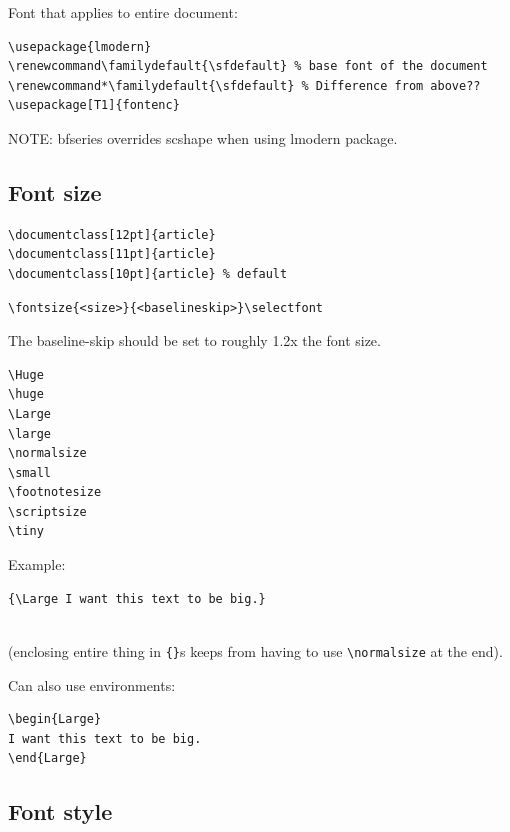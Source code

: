 \documentclass{article}
\begin{document}
Font that applies to entire document:

\begin{lstlisting}
\usepackage{lmodern}
\renewcommand\familydefault{\sfdefault} % base font of the document
\renewcommand*\familydefault{\sfdefault} % Difference from above??
\usepackage[T1]{fontenc}
\end{lstlisting}

NOTE: bfseries overrides scshape when using lmodern package.

\subsection{Font size}

\begin{lstlisting}
\documentclass[12pt]{article}
\documentclass[11pt]{article}
\documentclass[10pt]{article} % default
\end{lstlisting}

\begin{lstlisting}
\fontsize{<size>}{<baselineskip>}\selectfont
\end{lstlisting}

The baseline-skip should be set to roughly 1.2x the font size.

\begin{minipage}[t]{0.3\textwidth}
\begin{lstlisting}
\Huge
\huge
\Large
\large
\normalsize
\small
\footnotesize
\scriptsize
\tiny
\end{lstlisting}
\end{minipage}%
\begin{minipage}[t]{0.7\textwidth}
    Example:
\begin{lstlisting}
{\Large I want this text to be big.}
\end{lstlisting}
    \vspace{-2ex}{\Large I want this text to be big.}\\
(enclosing entire thing in \verb|{}|s keeps from having to use
\verb|\normalsize| at the end).

Can also use environments:
\begin{lstlisting}
\begin{Large}
I want this text to be big.
\end{Large}
\end{lstlisting}
\end{minipage}

\subsection{Font style}
\end{document}
